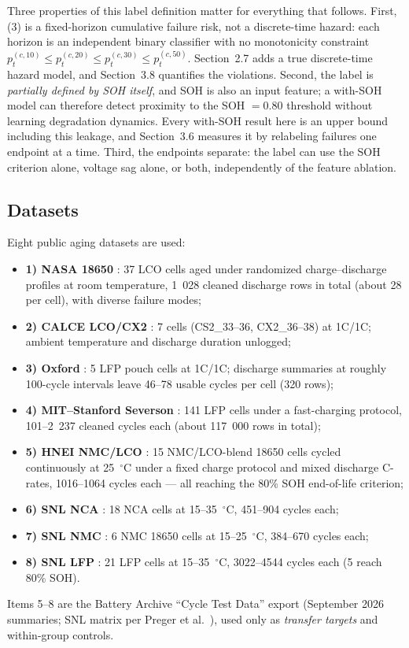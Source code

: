 \documentclass[preprint,12pt]{elsarticle}
\begin{document}
Three properties of this label definition matter for everything that follows. First, (3) is a fixed-horizon cumulative failure risk, not a discrete-time hazard: each horizon is an independent binary classifier with no monotonicity constraint $p_t^{(c,10)}\le p_t^{(c,20)}\le p_t^{(c,30)}\le p_t^{(c,50)}$. Section~2.7 adds a true discrete-time hazard model, and Section~3.8 quantifies the violations. Second, the label is \emph{partially defined by SOH itself}, and SOH is also an input feature; a with-SOH model can therefore detect proximity to the SOH $=0.80$ threshold without learning degradation dynamics. Every with-SOH result here is an upper bound including this leakage, and Section~3.6 measures it by relabeling failures one endpoint at a time. Third, the endpoints separate: the label can use the SOH criterion alone, voltage sag alone, or both, independently of the feature ablation.

\subsection{Datasets}
Eight public aging datasets are used:
\begin{itemize}
\item \textbf{1) NASA 18650} \cite{saha2007battery}: 37 LCO cells aged under randomized charge--discharge profiles at room temperature, 1~028 cleaned discharge rows in total (about 28 per cell), with diverse failure modes;
\item \textbf{2) CALCE LCO/CX2} \cite{calce2023battery}: 7 cells (CS2\_33--36, CX2\_36--38) at 1C/1C; ambient temperature and discharge duration unlogged;
\item \textbf{3) Oxford} \cite{birkl2017oxford}: 5 LFP pouch cells at 1C/1C; discharge summaries at roughly 100-cycle intervals leave 46--78 usable cycles per cell (320 rows);
\item \textbf{4) MIT--Stanford Severson} \cite{severson2019data,attia2020closedloop}: 141 LFP cells under a fast-charging protocol, 101--2~237 cleaned cycles each (about 117~000 rows in total);
\item \textbf{5) HNEI NMC/LCO} \cite{batteryarchive2023}: 15 NMC/LCO-blend 18650 cells cycled continuously at 25~$^\circ$C under a fixed charge protocol and mixed discharge C-rates, 1016--1064 cycles each --- all reaching the 80\% SOH end-of-life criterion;
\item \textbf{6) SNL NCA} \cite{batteryarchive2023,preger2020degradation}: 18 NCA cells at 15--35~$^\circ$C, 451--904 cycles each;
\item \textbf{7) SNL NMC} \cite{batteryarchive2023,preger2020degradation}: 6 NMC 18650 cells at 15--25~$^\circ$C, 384--670 cycles each;
\item \textbf{8) SNL LFP} \cite{batteryarchive2023,preger2020degradation}: 21 LFP cells at 15--35~$^\circ$C, 3022--4544 cycles each (5 reach 80\% SOH).
\end{itemize}
Items 5--8 are the Battery Archive ``Cycle Test Data'' export \cite{batteryarchive2023} (September 2026 summaries; SNL matrix per Preger et al.~\cite{preger2020degradation}), used only as \emph{transfer targets} and within-group controls.
\end{document}
